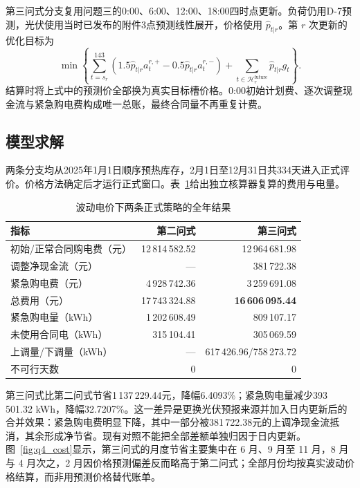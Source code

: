 \documentclass[withoutpreface,bwprint]{cumcmthesis}
\begin{document}
第三问式分支复用问题三的0:00、6:00、12:00、18:00四时点更新。负荷仍用D-7预测，光伏使用当时已发布的附件3点预测线性展开，价格使用 $\hat p_{t|r}$。第 $r$ 次更新的优化目标为
\begin{equation}
\min\left\{\sum_{t=s_r}^{143}\left(1.5\hat p_{t|r}a_t^{r,+}
-0.5\hat p_{t|r}a_t^{r,-}\right)
+\sum_{t\in\mathcal H_r^{\mathrm{future}}}\hat p_{t|r}g_t\right\}.
\end{equation}
结算时将上式中的预测价全部换为真实目标槽价格。0:00初始计划费、逐次调整现金流与紧急购电费构成唯一总账，最终合同量不再重复计费。

\subsection{模型求解}

两条分支均从2025年1月1日顺序预热库存，2月1日至12月31日共334天进入正式评价。价格方法确定后才运行正式窗口。表~\ref{tab:q4_result}给出独立核算器复算的费用与电量。

\begin{table}[htbp]
\centering
\caption{波动电价下两条正式策略的全年结果}
\begin{tabular}{lrr}
\toprule
指标 & 第二问式 & 第三问式 \\
\midrule
初始/正常合同购电费（元） & 12\,814\,582.52 & 12\,964\,681.98 \\
调整净现金流（元） & --- & 381\,722.38 \\
紧急购电费（元） & 4\,928\,742.36 & 3\,259\,691.08 \\
总费用（元） & 17\,743\,324.88 & \textbf{16\,606\,095.44} \\
紧急购电量（kWh） & 1\,202\,608.49 & 809\,107.17 \\
未使用合同电（kWh） & 315\,104.41 & 305\,069.59 \\
上调量/下调量（kWh） & --- & 617\,426.96/758\,273.72 \\
不可行天数 & 0 & 0 \\
\bottomrule
\end{tabular}
\label{tab:q4_result}
\end{table}

第三问式比第二问式节省1\,137\,229.44元，降幅6.4093\%；紧急购电量减少393\,501.32 kWh，降幅32.7207\%。这一差异是更换光伏预报来源并加入日内更新后的合并效果：紧急购电费明显下降，其中一部分被381\,722.38元的上调净现金流抵消，其余形成净节省。现有对照不能把全部差额单独归因于日内更新。图~\ref{fig:q4_cost}显示，第三问式的月度节省主要集中在 6 月、9 月至 11 月，8 月与 4 月次之，2 月因价格预测偏差反而略高于第二问式；全部月份均按真实波动价格结算，而非用预测价格替代账单。
\end{document}
